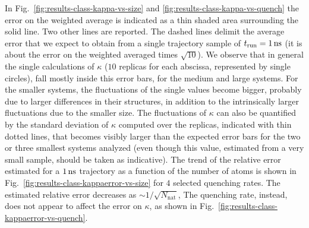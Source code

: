 In Fig.~\ref{fig:results-class-kappa-vs-size} and \ref{fig:results-class-kappa-vs-quench} the error on the weighted average is indicated as a thin shaded area surrounding the solid line. Two other lines are reported. The dashed lines delimit the average error that we expect to obtain from a single trajectory sample of $t_{\mathrm{run}}=1\,\mathrm{ns}$ (it is about the error on the weighted averaged times $\sqrt{10}$). 
We observe that in general the single calculations of $\kappa$ ($10$ replicas for each abscissa, represented by single circles), fall mostly inside this error bars, for the medium and large systems. For the smaller systems, the fluctuations of the single values become bigger, probably due to larger differences in their structures, in addition to the intrinsically larger fluctuations due to the smaller size. 
The fluctuations of $\kappa$ can also be quantified by the standard deviation of $\kappa$ computed over the replicas, indicated with thin dotted lines, that becomes visibly larger than the expected error bars for the two or three smallest systems analyzed (even though this value, estimated from a very small sample, should be taken as indicative).
The trend of the relative error estimated for a $1\,\mathrm{ns}$ trajectory as a function of the number of atoms is shown in Fig.~\ref{fig:results-class-kappaerror-vs-size} for $4$ selected quenching rates. The estimated relative error decreases as $\sim 1/\sqrt{N_\mathrm{nat}}$, 
The quenching rate, instead, does not appear to affect the error on $\kappa$, as shown in Fig.~\ref{fig:results-class-kappaerror-vs-quench}. 

